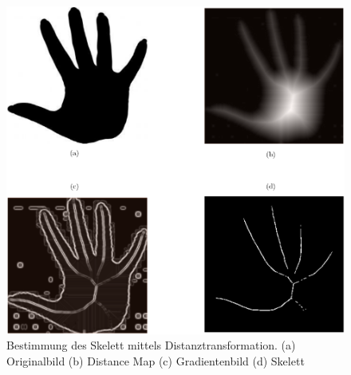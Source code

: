 \begin{figure}
\centering
\includegraphics[width=1.0\linewidth]{./fig/hand}
\caption{Bestimmung des Skelett mittels Distanztransformation. (a) Originalbild (b) Distance Map (c) Gradientenbild (d) Skelett}
\label{fig:hand-skelett}
\end{figure}
\newpage
